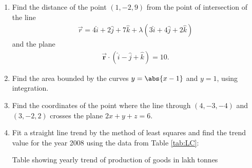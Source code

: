 %
\begin{enumerate}
	
	\item Find the distance of the point $(1,-2,9)$ from the point of intersection of the line
		\begin{align}
			\vec{r}=4\hat{i}+2\hat{j}+7\hat{k}+\lambda(3\hat{i}+4\hat{j}+2\hat{k})
		\end{align}and the plane
		\begin{align}
			\vec{\textbf{r}}\cdot(\hat{i}-\hat{j}+\hat{k})=10.
		\end{align}

	\item Find the area bounded by the curves $y=\abs{x-1}$ and $y=1$, using integration.

	\item Find the coordinates of the point where the line through $(4,-3,-4)$ and $(3,-2,2)$ crosses the plane $2x+y+z=6$.

	\item Fit a straight line trend by the method of least squares and find the trend value for the year 2008 using the data from Table \ref{tab:LC}:
		\begin{table}[H]
			\caption{Table showing yearly trend of production of goods in lakh tonnes \label{tab:LC}}
			
		\end{table}
\end{enumerate}
%
